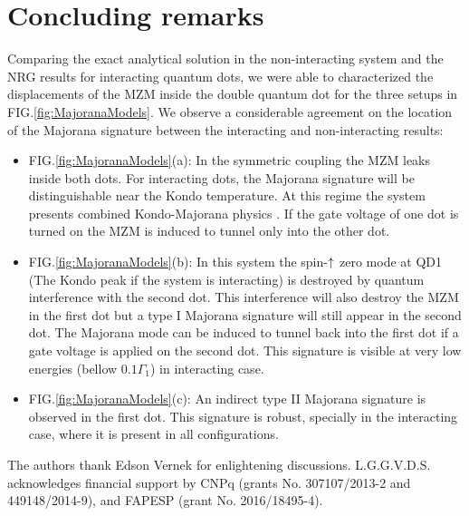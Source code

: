 \documentclass[showpacs,aps,prb,reprint,superscriptaddress]{revtex4-1}
\newcommand{\LUIS}[1]{\textcolor{blue}{\fbox{Luis} {\sl#1}}}
\begin{document}
\section{Concluding remarks}
\label{sec:Conclusions}
Comparing the exact analytical solution in the non-interacting system and the NRG results for interacting quantum dots, we were able to characterized the displacements of the MZM inside the double quantum dot for the three setups in FIG.\ref{fig:MajoranaModels}. We observe a considerable agreement on the location of the Majorana signature between the interacting and non-interacting results:

\begin{itemize}
	\item[]FIG.\ref{fig:MajoranaModels}(a): In the symmetric coupling the MZM leaks inside both dots. For interacting dots, the Majorana signature will be distinguishable near the Kondo temperature. At this regime the system presents combined Kondo-Majorana physics . If the gate voltage of one dot is turned on the MZM is induced to tunnel only into the other dot.  
	\item[]FIG.\ref{fig:MajoranaModels}(b): In this system the spin-$\uparrow$ zero mode at QD1 (The Kondo peak if the system is interacting) is destroyed by quantum interference with the second dot. This interference will also destroy the MZM in the first dot but a type I Majorana signature will still appear in the second dot. The Majorana mode can be induced to tunnel back into the first dot if a gate voltage is applied on the second dot. This signature is visible at very low energies (bellow $0.1\Gamma_1$) in interacting case. 
	\item[]FIG.\ref{fig:MajoranaModels}(c): An indirect type II Majorana signature is observed in the first dot. This signature is robust, specially in the interacting case, where it is present in all configurations. 

\end{itemize}


\begin{acknowledgments}
The authors thank Edson Vernek for enlightening discussions.  L.G.G.V.D.S. acknowledges financial support by CNPq (grants No. 307107/2013-2 and 449148/2014-9), and FAPESP (grant No. 2016/18495-4).
\end{acknowledgments}

\end{document}
